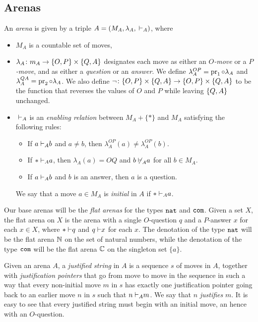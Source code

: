 \documentclass[sigplan,10pt,review]{acmart}\settopmatter{printfolios=true,printccs=false,printacmref=false}
\begin{document}
\subsection{Arenas}

An \emph{arena} is given by a triple $A=(M_A,\lambda_A,{\;\vdash}_A)$, where
\begin{itemize}
  \item $M_A$ is a countable set of moves,
  \item $\lambda_A\colon m_A\to\{O,P\}\times\{Q,A\}$ designates each move as either an \emph{$O$-move} or a \emph{$P$-move}, and as either a \emph{question} or an \emph{answer}.  
    We define $\lambda_A^{OP}=\operatorname{pr}_1\circ\lambda_A$ and $\lambda_A^{QA}=\operatorname{pr}_2\circ\lambda_A$.  
    We also define $\neg\colon\{O,P\}\times\{Q,A\}\to\{O,P\}\times\{Q,A\}$ to be the function that reverses the values of $O$ and $P$ while leaving $\{Q,A\}$ unchanged.
  \item ${\;\vdash}_A$ is an \emph{enabling relation} between $M_A+\{*\}$ and $M_A$ satisfying the following rules:
    \begin{itemize}
      \item If $a{\;\vdash}_A b$ and $a\ne b$, then $\lambda_A^{OP}(a)\neq\lambda_A^{OP}(b)$.  
      \item If $*{\;\vdash}_A a$, then $\lambda_A(a)=OQ$ and $b{\;\not\vdash}_A a$ for all $b\in M_A$.
      \item If $a{\;\vdash}_A b$ and $b$ is an answer, then $a$ is a question.
    \end{itemize}
    We say that a move $a\in M_A$ is \emph{initial} in $A$ if $*{\;\vdash}_A a$.
\end{itemize}

Our base arenas will be the \emph{flat arenas} for the types ${\mathtt{nat}}$ and ${\mathtt{com}}$.  
Given a set $X$, the flat arena on $X$ is the arena with a single $O$-question $q$ and a $P$-answer $x$ for each $x\in X$, where $*{\;\vdash} q$ and $q{\;\vdash} x$ for each $x$.  
The denotation of the type ${\mathtt{nat}}$ will be the flat arena $\mathbb{N}$ on the set of natural numbers, while the denotation of the type ${\mathtt{com}}$ will be the flat arena $\mathbb{C}$ on the singleton set $\{a\}$.

Given an arena $A$, a \emph{justified string} in $A$ is a sequence $s$ of moves in $A$, together with \emph{justification pointers} that go from move to move in the sequence in such a way that every non-initial move $m$ in $s$ has exactly one justification pointer going back to an earlier move $n$ in $s$ such that $n{\;\vdash}_A m$.  
We say that $n$ \emph{justifies} $m$.  
It is easy to see that every justified string must begin with an initial move, an hence with an $O$-question.  
\end{document}
